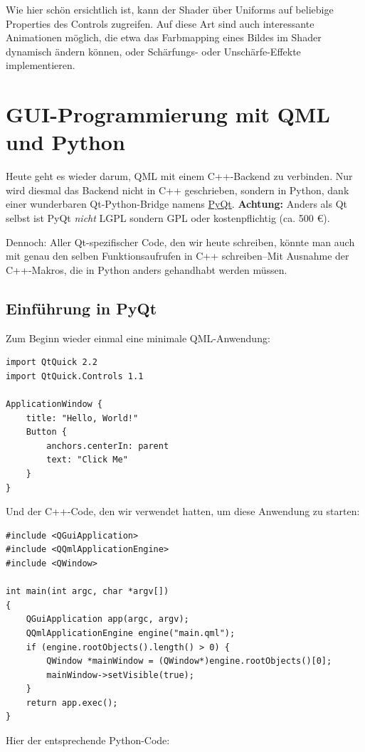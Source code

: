 \documentclass[a4paper]{article}
\begin{document}
Wie hier schön ersichtlich ist, kann der Shader über Uniforms auf beliebige Properties des Controls zugreifen. Auf diese Art sind auch interessante Animationen möglich, die etwa das Farbmapping eines Bildes im Shader dynamisch ändern können, oder Schärfungs- oder Unschärfe-Effekte implementieren.
\section{GUI-Programmierung mit QML und Python}
\label{sec-4}
Heute geht es wieder darum, QML mit einem C++-Backend zu verbinden. Nur wird diesmal das Backend nicht in C++ geschrieben, sondern in Python, dank einer wunderbaren Qt-Python-Bridge namens \href{http://www.riverbankcomputing.com/software/pyqt/intro}{PyQt}. \textbf{Achtung:} Anders als Qt selbst ist PyQt \emph{nicht} LGPL sondern GPL oder kostenpflichtig (ca. 500 €).

Dennoch: Aller Qt-spezifischer Code, den wir heute schreiben, könnte man auch mit genau den selben Funktionsaufrufen in C++ schreiben--Mit Ausnahme der C++-Makros, die in Python anders gehandhabt werden müssen.

\subsection{Einführung in PyQt}
\label{sec-4-1}
Zum Beginn wieder einmal eine minimale QML-Anwendung:

\begin{verbatim}
import QtQuick 2.2
import QtQuick.Controls 1.1

ApplicationWindow {
    title: "Hello, World!"
    Button {
        anchors.centerIn: parent
        text: "Click Me"
    }
}
\end{verbatim}

Und der C++-Code, den wir verwendet hatten, um diese Anwendung zu starten:

\begin{verbatim}
#include <QGuiApplication>
#include <QQmlApplicationEngine>
#include <QWindow>

int main(int argc, char *argv[])
{
    QGuiApplication app(argc, argv);
    QQmlApplicationEngine engine("main.qml");
    if (engine.rootObjects().length() > 0) {
        QWindow *mainWindow = (QWindow*)engine.rootObjects()[0];
        mainWindow->setVisible(true);
    }
    return app.exec();
}
\end{verbatim}

Hier der entsprechende Python-Code:
\end{document}
